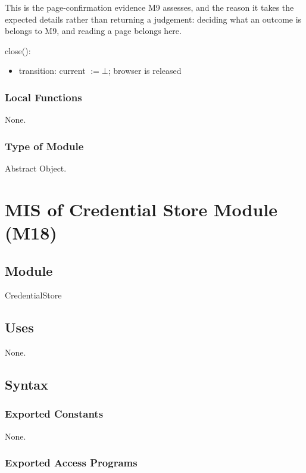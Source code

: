 \documentclass[12pt, titlepage]{article}
\newcommand{\nil}{\bot}
\begin{document}
\noindent This is the page-confirmation evidence M9 assesses, and the reason it
takes the expected details rather than returning a judgement: deciding what an
outcome is belongs to M9, and reading a page belongs here.

\noindent close():
\begin{itemize}
\item transition: current $:= \nil$; browser is released
\end{itemize}

\subsubsection{Local Functions}

None.

\subsubsection{Type of Module}

Abstract Object.

\newpage

\section{MIS of Credential Store Module (M18)} \label{mod:creds}

\subsection{Module}

CredentialStore

\subsection{Uses}

None.

\subsection{Syntax}

\subsubsection{Exported Constants}

None.

\subsubsection{Exported Access Programs}
\end{document}
